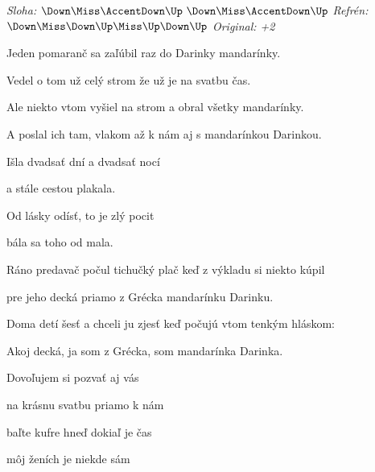 \begin{song}


 \quad
\textit{Sloha:} $\Down\Miss\AccentDown\Up\ \Down\Miss\AccentDown\Up$ \quad
\textit{Refrén:} $\Down\Miss\Down\Up\Miss\Up\Down\Up$ \quad
\textit{Original: +2}

\large


\Large

\bigskip

Jeden pomaranč sa zaľúbil raz do Darinky mandarínky.\par
{}Vedel o tom už celý strom že už je na svatbu čas.\par
{}Ale niekto vtom vyšiel na strom a obral všetky mandarínky.\par
A poslal ich tam, vlakom až k nám aj s mandarínkou Darinkou.\par

\bigskip

Išla dvadsať dní a dvadsať nocí\par
a stále cestou plakala.\par
{}Od lásky odísť, to je zlý pocit\par
{}bála sa toho od mala. \par

\bigskip

Ráno predavač počul tichučký plač keď z výkladu si niekto kúpil\par
pre jeho decká priamo z Grécka mandarínku Darinku.\par
{}Doma detí šesť a chceli ju zjesť keď počujú vtom tenkým hláskom:\par
{}Akoj decká, ja som z Grécka, som mandarínka Darinka.\par

\bigskip

Dovoľujem si pozvať aj vás\par
na krásnu svatbu priamo k nám\par
{}baľte kufre hneď dokiaľ je čas\par
{}môj ženích je niekde sám \par


\end{song}
